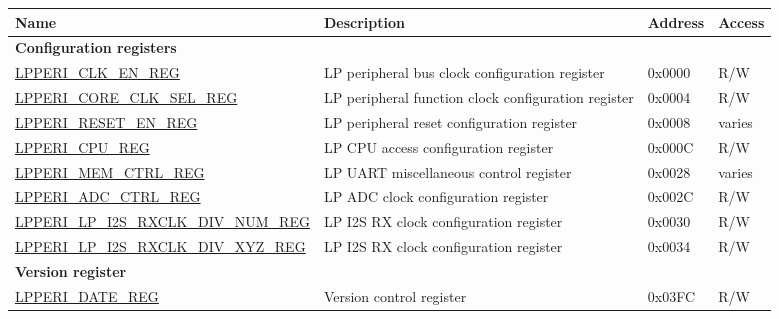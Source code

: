 \begin{longtable}{ | p{7.5cm} | p{6.2cm} | p{1.3cm} | p{1cm} | }
\hline\rowcolor{lightgray}
Name & Description &  Address & Access \\ \hline
\endhead
\multicolumn{4}{|l|}{\textbf{Configuration registers}} \\ \hline
\hyperref[regdesc:LPPERICLKENREG]{LPPERI\_CLK\_EN\_REG} & LP peripheral bus clock configuration register & 0x0000 & R/W \\ \hline
\hyperref[regdesc:LPPERICORECLKSELREG]{LPPERI\_CORE\_CLK\_SEL\_REG} & LP peripheral function clock configuration register & 0x0004 & R/W \\ \hline
\hyperref[regdesc:LPPERIRESETENREG]{LPPERI\_RESET\_EN\_REG} & LP peripheral reset configuration register & 0x0008 & varies \\ \hline
\hyperref[regdesc:LPPERICPUREG]{LPPERI\_CPU\_REG} & LP CPU access configuration register & 0x000C & R/W \\ \hline
\hyperref[regdesc:LPPERIMEMCTRLREG]{LPPERI\_MEM\_CTRL\_REG} & LP UART miscellaneous control register & 0x0028 & varies \\ \hline
\hyperref[regdesc:LPPERIADCCTRLREG]{LPPERI\_ADC\_CTRL\_REG} & LP ADC clock configuration register & 0x002C & R/W \\ \hline
\hyperref[regdesc:LPPERILPI2SRXCLKDIVNUMREG]{LPPERI\_LP\_I2S\_RXCLK\_DIV\_NUM\_REG} & LP I2S RX clock configuration register & 0x0030 & R/W \\ \hline
\hyperref[regdesc:LPPERILPI2SRXCLKDIVXYZREG]{LPPERI\_LP\_I2S\_RXCLK\_DIV\_XYZ\_REG} & LP I2S RX clock configuration register & 0x0034 & R/W \\ \hline
\multicolumn{4}{|l|}{\textbf{Version register}} \\ \hline
\hyperref[regdesc:LPPERIDATEREG]{LPPERI\_DATE\_REG} & Version control register & 0x03FC & R/W \\ \hline
\end{longtable}
